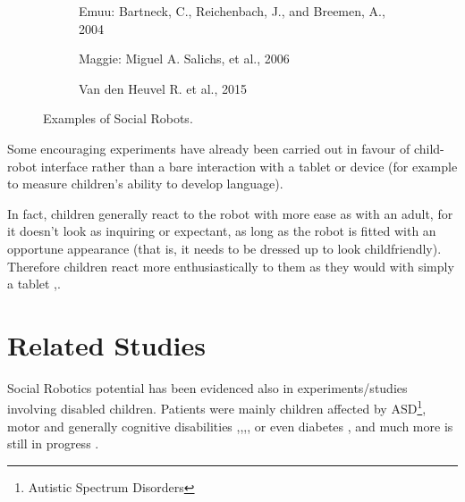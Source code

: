 \documentclass[a4paper,twoside]{book}
\begin{document}
\begin{figure}[h]
\begin{subfigure}[b]{0.3\textwidth}
  \end{subfigure}
  \begin{subfigure}[t]{0.3\textwidth}
    \caption{Emuu: Bartneck, C., Reichenbach, J., and Breemen, A., 2004}
  \end{subfigure}%
  \quad%
  \begin{subfigure}[t]{0.3\textwidth}
    \caption{Maggie: Miguel A. Salichs, et al., 2006}
  \end{subfigure}%
  \quad%
  \begin{subfigure}[t]{0.3\textwidth}
    \caption{Van den Heuvel R. et al., 2015}
  \end{subfigure}
  \caption{Examples of Social Robots.}
\end{figure}

Some encouraging experiments have already been carried out in favour of child-robot interface rather than a bare interaction with a tablet or device (for example to measure children's ability to develop language).

In fact, children generally react to the robot with more ease as with an adult, for it doesn't look as inquiring or expectant, as long as the robot is fitted with an opportune appearance (that is, it needs to be dressed up to look child\textendash friendly). Therefore children react more enthusiastically to them as they would with simply a tablet \cite{art12},\cite{art13}.

\chapter{Related Studies}

Social Robotics potential has been evidenced also in experiments/studies involving disabled children. Patients were mainly children affected by ASD\footnote{Autistic Spectrum Disorders}, motor and generally cognitive disabilities \cite{art1},\cite{art6},\cite{art7},\cite{art10}, or even diabetes \cite{art5}, and much more is still in progress \cite{art11}.
\end{document}
